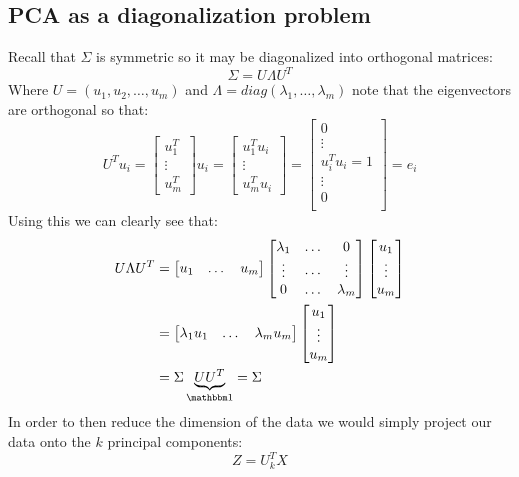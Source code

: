 \subsection{PCA as a diagonalization problem}
Recall that $\Sigma$ is symmetric so it may be diagonalized into orthogonal matrices:
\begin{equation}
\Sigma = U\Lambda U^T
\end{equation}
Where $U=(u_1, u_2, \dots, u_m)$ and $\Lambda = diag(\lambda_1, \dots, \lambda_m)$ note that the eigenvectors are orthogonal so that:
\begin{equation}
	U^Tu_i = \begin{bmatrix}
	u_1^T\\
	\vdots\\
	u_m^T
	\end{bmatrix}u_i = \begin{bmatrix}
	u_1^Tu_i\\
	\vdots\\
	u_m^Tu_i
	\end{bmatrix} = \begin{bmatrix}
	0\\
	\vdots\\
	u_i^Tu_i = 1\\
	\vdots\\
	0\\
	\end{bmatrix}=e_i
\end{equation}
Using this we can clearly see that:
\begin{equation}
\begin{split}
	U\Lambda U^T & =\begin{bmatrix}
	u_1 & \dots & u_m\\
	\end{bmatrix}
	\begin{bmatrix}
	\lambda_1 &\dots & 0\\
	\vdots&\cdots&\vdots\\
	0& \dots& \lambda_m\\
	\end{bmatrix}
	\begin{bmatrix}
	u_1 \\ \vdots \\ u_m\\
	\end{bmatrix}		\\
	&=\begin{bmatrix}
	\lambda_1u_1 & \dots & \lambda_mu_m\\
	\end{bmatrix}\begin{bmatrix}
	u_1 \\ \vdots \\ u_m\\
	\end{bmatrix}\\
	&= \Sigma \underbrace{UU^T}_{\ID} = \Sigma
\end{split}
\end{equation}
In order to then reduce the dimension of the data we
would simply project our data onto the $k$ principal
components:
\begin{equation}
Z = U_k^T X
\end{equation}

